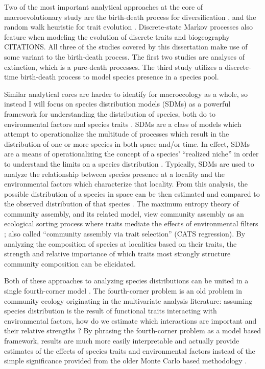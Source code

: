 Two of the most important analytical approaches at the core of macroevolutionary study are the birth-death process for diversification \citep{Raup1973,Raup1985,Nee1992,Nee1994a,Nee2001,Nee2006b,Stadler2013b}, and the random walk heuristic for trait evolution \citep{Raup1974a,Felsenstein1985b,Bookstein1987b,Gingerich1993,Roopnarine2001a,Roopnarine2003b,Roopnarine1999,Sheets2001,Hunt2006a,Hunt2007a}. Discrete-state Markov processes also feature when modeling the evolution of discrete traits and biogeography CITATIONS. All three of the studies covered by this dissertation make use of some variant to the birth-death process. The first two studies are analyses of extinction, which is a pure-death processes. The third study utilizes a discrete-time birth-death process to model species presence in a species pool.

Similar analytical cores are harder to identify for macroecology as a whole, so instead I will focus on species distribution models (SDMs) as a powerful framework for understanding the distribution of species, both do to environmental factors \citep{Elith2009} and species traits \citep{Shipley2006}. SDMs are a class of models which attempt to operationalize the multitude of processes which result in the distribution of one or more species in both space and/or time. In effect, SDMs are a means of operationalizing the concept of a species' ``realized niche'' in order to understand the limits on a species distribution \citep{Elith2009}. Typically, SDMs are used to analyze the relationship between species presence at a locality and the environmental factors which characterize that locality. From this analysis, the possible distribution of a species in space can be then estimated and compared to the observed distribution of that species \citep{Elith2009,Austin2006,Phillips2006a}. The maximum entropy theory of community assembly, and its related model, view community assembly as an ecological sorting process where traits mediate the effects of environmental filters \citep{Shipley2006,Warton2015a}; also called ``community assembly via trait selection'' (CATS regression). By analyzing the composition of species at localities based on their traits, the strength and relative importance of which traits most strongly structure community composition can be elicidated. 

Both of these approaches to analyzing species distributions can be united in a single fourth-corner model \citep{Warton2015a,Brown2014c}. The fourth-corner problem is an old problem in community ecology originating in the multivariate analysis literature: assuming species distribution is the result of functional traits interacting with environmental factors, how do we estimate which interactions are important and their relative strengths \citep{Legendre1997,Dray2008}? By phrasing the fourth-corner problem as a model based framework, results are much more easily interpretable and actually provide estimates of the effects of species traits and environmental factors instead of the simple significance provided from the older Monte Carlo based methodology \citep{Brown2014c,Jamil2013,Pollock2012,Pollock2015}.

